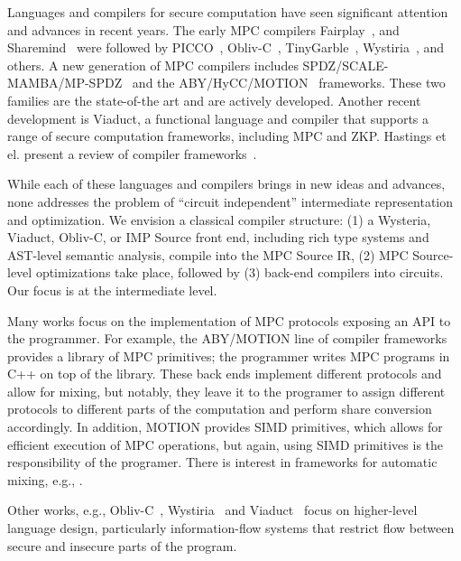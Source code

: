 \documentclass[sigconf, screen, natbib=false, dvipsnames, table]{acmart}
\theoremstyle{definition}
\begin{document}
Languages and compilers for secure computation have seen significant attention and advances in recent years. The early MPC compilers Fairplay~\cite{CCS:BenNisPin08}, 
and Sharemind~\cite{ESORICS:BogLauWil08} were followed by PICCO~\cite{CCS:ZhaSteBla13}, Obliv-C~\cite{Zahur:2015}, TinyGarble~\cite{SP:SHSSK15}, 
Wystiria~\cite{SP:RasHamHic14}, and others. A new generation of MPC compilers 
includes SPDZ/SCALE-MAMBA/MP-SPDZ~\cite{Keller:2020} and the ABY/HyCC/MOTION~\cite{NDSS:DemSchZoh15,CCS:BDKKS18,Braun:2022} frameworks. 
These two families are the state-of-the art and
are actively developed. Another recent development is Viaduct, a functional language and compiler that supports a range of secure computation 
frameworks, including MPC and ZKP. Hastings et el. present a review of compiler frameworks~\cite{Hastings:2019}.

While each of these languages and compilers brings in new ideas and advances, none addresses the problem of ``circuit independent'' intermediate 
representation and optimization. We envision a classical compiler structure: (1) a Wysteria, Viaduct, Obliv-C, or IMP Source front end, including rich type systems and 
AST-level semantic analysis, compile into the MPC Source IR, (2) MPC Source-level optimizations take place, followed by (3) back-end compilers into circuits. 
Our focus is at the intermediate level.


Many works focus on the implementation of MPC protocols exposing an API to the programmer. For example, the ABY/MOTION line of 
compiler frameworks provides a library of MPC primitives; the programmer writes MPC programs in C++ on top of the library. These back ends implement 
different protocols and allow for mixing, but notably, they leave it to the programer to assign different protocols to different parts of the 
computation and perform share conversion accordingly. In addition, MOTION provides SIMD primitives, which allows for efficient execution 
of MPC operations, but again, using SIMD primitives is the responsibility of the programer. There is interest in frameworks for automatic mixing, 
e.g., \cite{CCS:BDKKS18,Ishaq:2019,Fang:2022}.

Other works, e.g., Obliv-C~\cite{Zahur:2015}, Wystiria~\cite{SP:RasHamHic14} and Viaduct~\cite{Acay:2021} focus on higher-level language design, particularly information-flow systems that 
restrict flow between secure and insecure parts of the program. 
\end{document}
